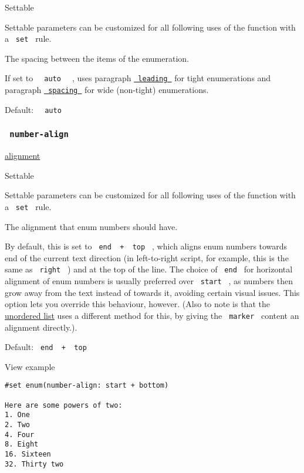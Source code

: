 {{ Settable }}

\label{parameters-spacing-settable-tooltip}
Settable parameters can be customized for all following uses of the
function with a \texttt{\ set\ } rule.

The spacing between the items of the enumeration.

If set to \texttt{\ }{\texttt{\ auto\ }}\texttt{\ } , uses paragraph
\href{/docs/reference/model/par/\#parameters-leading}{\texttt{\ leading\ }}
for tight enumerations and paragraph
\href{/docs/reference/model/par/\#parameters-spacing}{\texttt{\ spacing\ }}
for wide (non-tight) enumerations.

Default: \texttt{\ }{\texttt{\ auto\ }}\texttt{\ }

\subsubsection{\texorpdfstring{\texttt{\ number-align\ }}{ number-align }}\label{parameters-number-align}

\href{/docs/reference/layout/alignment/}{alignment}

{{ Settable }}

\label{parameters-number-align-settable-tooltip}
Settable parameters can be customized for all following uses of the
function with a \texttt{\ set\ } rule.

The alignment that enum numbers should have.

By default, this is set to
\texttt{\ end\ }{\texttt{\ +\ }}\texttt{\ top\ } , which aligns enum
numbers towards end of the current text direction (in left-to-right
script, for example, this is the same as \texttt{\ right\ } ) and at the
top of the line. The choice of \texttt{\ end\ } for horizontal alignment
of enum numbers is usually preferred over \texttt{\ start\ } , as
numbers then grow away from the text instead of towards it, avoiding
certain visual issues. This option lets you override this behaviour,
however. (Also to note is that the
\href{/docs/reference/model/list/}{unordered list} uses a different
method for this, by giving the \texttt{\ marker\ } content an alignment
directly.).

Default: \texttt{\ end\ }{\texttt{\ +\ }}\texttt{\ top\ }


View example

\begin{verbatim}
#set enum(number-align: start + bottom)

Here are some powers of two:
1. One
2. Two
4. Four
8. Eight
16. Sixteen
32. Thirty two
\end{verbatim}

